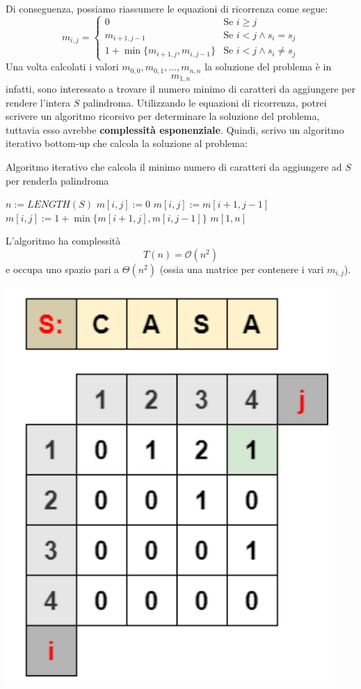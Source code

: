 \documentclass[12pt]{article}
\begin{document}
Di conseguenza, possiamo riassumere le equazioni di ricorrenza come segue:
\begin{equation*}
    m_{i,j} = \begin{cases}
        0 & \textrm{Se } i \geq j \\
        m_{i+1, j-1} & \textrm{Se } i < j \land s_i = s_j \\
        1 + \min\{m_{i+1,j}, m_{i, j-1}\} & \textrm{Se } i < j \land s_i \neq s_j 
    \end{cases}
\end{equation*}
Una volta calcolati i valori $m_{0,0}, m_{0,1}, \dots, m_{n,n}$ la soluzione del problema è in
$$m_{1, n}$$
infatti, sono interessato a trovare il numero minimo di caratteri da aggiungere per rendere l'intera $S$ palindroma.
Utilizzando le equazioni di ricorrenza, potrei scrivere un algoritmo ricorsivo per determinare la soluzione del problema, tuttavia
esso avrebbe \textbf{complessità esponenziale}. Quindi, scrivo un algoritmo iterativo bottom-up che calcola la soluzione al problema: \newline
\begin{algorithm}[H]
    \caption{Algoritmo iterativo che calcola il minimo numero di caratteri da aggiungere ad $S$ per renderla palindroma}
    \DontPrintSemicolon
     {
        $n := LENGTH(S)$ \;
         {
             {
                $m[i,j] := 0$
            }
        }
         {
             {
                 {
                    $m[i,j] := m[i+1, j-1]$
                } {
                    $m[i,j] := 1 + \min\{m[i+1, j], m[i, j-1]\}$
                }
            }
        }
        \Return $m[1,n]$
    }
\end{algorithm} \noindent
L'algoritmo ha complessità
$$T(n) = \mathcal{O}(n^2)$$
e occupa uno spazio pari a $\Theta(n^2)$ (ossia una matrice per contenere i vari $m_{i,j}$).
\begin{center}
    \includegraphics[width = 0.40\linewidth]{Images/15.png}
\end{center}
\end{document}
